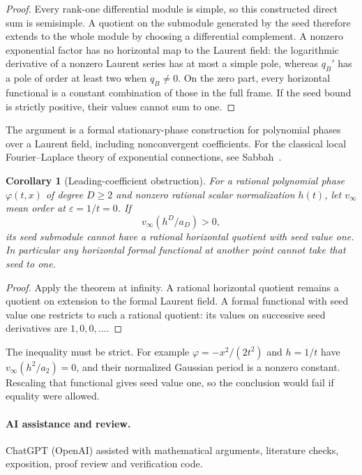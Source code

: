 \documentclass[11pt]{article}
\newtheorem{corollary}[theorem]{Corollary}
\theoremstyle{definition}\newtheorem{definition}[theorem]{Definition}
\theoremstyle{remark}\newtheorem{remark}[theorem]{Remark}
\begin{document}
\begin{proof}
Every rank-one differential module is simple, so this constructed
direct sum is semisimple. A quotient on the submodule generated by
the seed therefore extends to the whole module by choosing a
differential complement. A nonzero exponential factor has no
horizontal map to the Laurent field: the logarithmic derivative of
a nonzero Laurent series has at most a simple pole, whereas $q_B'$
has a pole of order at least two when $q_B\ne0$. On the zero part,
every horizontal functional is a constant combination of those in
the full frame. If the seed bound is strictly positive, their values
cannot sum to one.
\end{proof}

The argument is a formal stationary-phase construction for polynomial
phases over a Laurent field, including nonconvergent coefficients.
For the classical local Fourier--Laplace theory of exponential
connections, see Sabbah~\cite{SabbahStationary}.

\begin{corollary}[Leading-coefficient obstruction]\label{cor:leadingobstruction}
For a rational polynomial phase $\varphi(t,x)$ of degree $D\geq2$
and nonzero rational scalar normalization $h(t)$, let $v_\infty$
mean order at $\varepsilon=1/t=0$. If
\begin{equation}\label{eq:leadingcriterion}
 v_\infty(h^D/a_D)>0,
\end{equation}
its seed submodule cannot have a rational horizontal quotient with
seed value one. In particular any horizontal formal functional at
another point cannot take that seed to one.
\end{corollary}
\begin{proof}
Apply the theorem at infinity. A rational horizontal quotient remains
a quotient on extension to the formal Laurent field. A formal
functional with seed value one restricts to such a rational quotient:
its values on successive seed derivatives are $1,0,0,\ldots$.
\end{proof}

The inequality must be strict. For example
$\varphi=-x^2/(2t^2)$ and $h=1/t$ have
$v_\infty(h^2/a_2)=0$, and their normalized Gaussian period is a
nonzero constant. Rescaling that functional gives seed value one,
so the conclusion would fail if equality were allowed.


\paragraph{AI assistance and review.}
ChatGPT (OpenAI) assisted with mathematical arguments, literature checks,
exposition, proof review and verification code.
\end{document}
